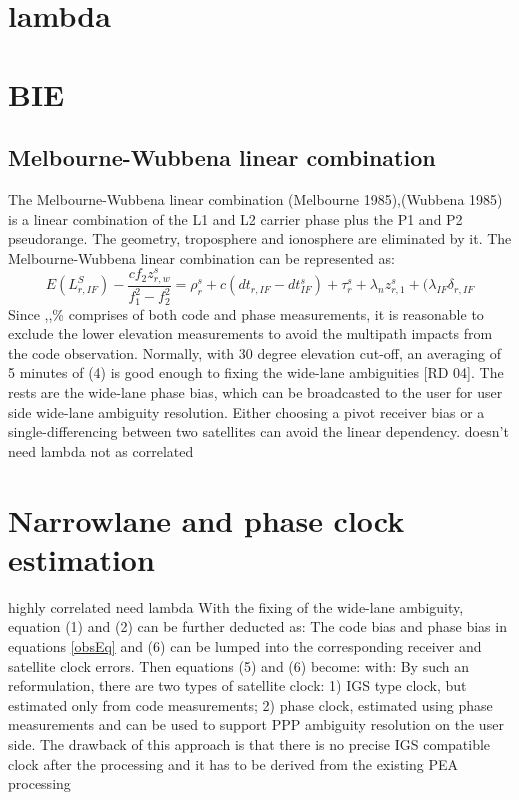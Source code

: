 \section{lambda}
\section{BIE}
\subsection{Melbourne-Wubbena linear combination}
The Melbourne-Wubbena linear combination (Melbourne 1985),(Wubbena 1985) is a linear combination of the L1 and L2 carrier phase plus the P1 and P2 pseudorange. The geometry, troposphere and ionosphere are eliminated by it. The Melbourne-Wubbena linear combination can be represented as:
%
\begin{equation}
E(L_{r,IF}^S) - \frac{cf_2z_{r,w}^s}{f_1^2 - f_2^2} = \rho_r^s + c(dt_{r,IF} - dt_{IF}^s) + \tau_r^s + \lambda_n z_{r,1}^s + (\lambda_{IF}\delta_{r,IF}
\end{equation}
%
Since ,,\% comprises of both code and phase measurements, it is reasonable to exclude the lower
elevation measurements to avoid the multipath impacts from the code observation. Normally, with
30 degree elevation cut-off, an averaging of 5 minutes of (4) is good enough to fixing the wide-lane
ambiguities [RD 04]. The rests are the wide-lane phase bias, which can be broadcasted to the user for
user side wide-lane ambiguity resolution. Either choosing a pivot receiver bias or a single-differencing
between two satellites can avoid the linear dependency. 
%
%
doesn't need lambda not as correlated
%
\section{Narrowlane and phase clock estimation}
%
highly correlated need lambda
%
%
With the fixing of the wide-lane ambiguity, equation (1) and (2) can be further deducted as:
%
The code bias and phase bias in equations \eqref{obsEq} and (6) can be lumped into the corresponding receiver
and satellite clock errors. Then equations (5) and (6) become:
%
with:
%
By such an reformulation, there are two types of satellite clock: 1) IGS type clock, but estimated only
from code measurements; 2) phase clock, estimated using phase measurements and can be used to
support PPP ambiguity resolution on the user side. The drawback of this approach is that there is no
precise IGS compatible clock after the processing and it has to be derived from the existing PEA
processing
%
